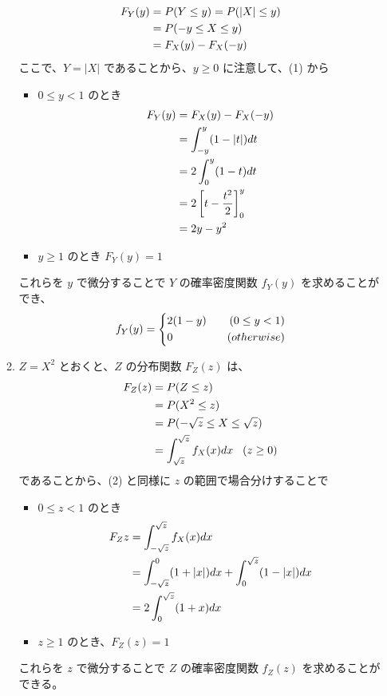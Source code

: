 \documentclass[a4paper,12pt]{ltjarticle}
\begin{document}
\begin{enumerate}[label=\textbf{問\arabic*}]
\begin{enumerate}[label=(\arabic*)]
\begin{align}
  F_Y(y) 
  &= P(Y \leq y) = P(|X| \leq y) \notag\\
  &= P(-y \leq X \leq y) \notag\\
  &= F_X(y) - F_X(-y) \notag
\end{align}
ここで、$Y=|X|$ であることから、$y \geq 0$ に注意して、(1) から
\begin{itemize}
  \item $0 \leq y < 1$ のとき
  \begin{align}
    F_Y(y) 
    &= F_X(y) - F_X(-y) \notag\\
    &= \int_{-y}^{y} (1 - |t|) dt \notag \\
    &= 2\int_{0}^{y} (1-t) dt \notag \\
    &= 2\left[t-\frac{t^2}{2}\right]_{0}^{y} \notag \\
    &= 2y - y^2
  \end{align}
  \item $y \geq 1$ のとき $F_Y(y) = 1$
\end{itemize}
これらを $y$ で微分することで $Y$ の確率密度関数 $f_Y(y)$ を求めることができ、
\begin{equation}
  f_Y(y) = \left\{
  \begin{aligned}
    &2(1-y)\hspace{3mm} & (0 \leq y < 1) \\
    &0\hspace{3mm} & (otherwise)
  \end{aligned}
  \right.
\end{equation}
\item $Z=X^2$ とおくと、$Z$ の分布関数 $F_Z(z)$ は、
\begin{align}
  F_Z(z) 
  &= P(Z \leq z) \notag\\
  &= P(X^2 \leq z) \notag\\
  &= P(-\sqrt{z} \leq X \leq \sqrt{z}) \notag\\ 
  &= \int_{\sqrt{z}}^{\sqrt{z}} f_X(x) dx \hspace{3mm}(z \geq 0)
\end{align}
であることから、(2) と同様に $z$ の範囲で場合分けすることで
\begin{itemize}
  \item $0 \leq z < 1$ のとき
    \begin{align}
      F_Z{z}
      &= \int_{-\sqrt{z}}^{\sqrt{z}} f_X(x) dx \notag\\
      &= \int_{-\sqrt{z}}^{0} (1+|x|) dx + \int_{0}^{\sqrt{z}} (1-|x|) dx \notag\\
      &= 2\int_{0}^{\sqrt{z}} (1+x) dx \notag
    \end{align}
  \item $z \geq 1$ のとき、$F_Z(z) = 1$
\end{itemize}
これらを $z$ で微分することで $Z$ の確率密度関数 $f_Z(z)$ を求めることができる。
\end{enumerate}
\end{enumerate}
\end{document}
